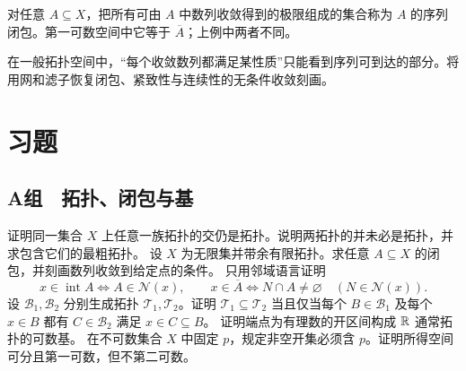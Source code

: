 对任意 \(A\subseteq X\)，把所有可由 \(A\) 中数列收敛得到的极限组成的集合称为 \(A\) 的序列闭包。第一可数空间中它等于 \(\overline A\)；上例中两者不同。

在一般拓扑空间中，“每个收敛数列都满足某性质”只能看到序列可到达的部分。将用网和滤子恢复闭包、紧致性与连续性的无条件收敛刻画。

\section*{习题}

\subsection*{A组　拓扑、闭包与基}
\begin{enumerate}[label=\textbf{\thechapter.\arabic*.}]
 证明同一集合 \(X\) 上任意一族拓扑的交仍是拓扑。说明两拓扑的并未必是拓扑，并求包含它们的最粗拓扑。
 设 \(X\) 为无限集并带余有限拓扑。求任意 \(A\subseteq X\) 的闭包，并刻画数列收敛到给定点的条件。
 只用邻域语言证明
 \[
 x\in\operatorname{int}A\Longleftrightarrow A\in\mathcal N(x),
 \qquad
 x\in\overline A\Longleftrightarrow
 N\cap A\ne\varnothing\quad(N\in\mathcal N(x)).
 \]
 设 \(\mathcal B_1,\mathcal B_2\) 分别生成拓扑 \(\mathcal T_1,\mathcal T_2\)。证明
 \(\mathcal T_1\subseteq\mathcal T_2\) 当且仅当每个 \(B\in\mathcal B_1\) 及每个 \(x\in B\) 都有 \(C\in\mathcal B_2\) 满足 \(x\in C\subseteq B\)。
 证明端点为有理数的开区间构成 \(\mathbb{R}\) 通常拓扑的可数基。
 在不可数集合 \(X\) 中固定 \(p\)，规定非空开集必须含 \(p\)。证明所得空间可分且第一可数，但不第二可数。
\end{enumerate}

